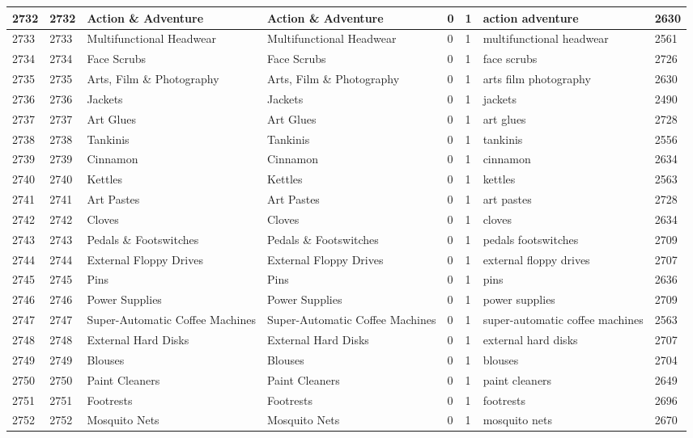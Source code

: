 \begin{longtable}{|l|l|l|l|l|l|l|l|}
2732 & 2732 & Action \& Adventure & Action \& Adventure & 0 & 1 & action adventure & 2630 \\ \hline 
2733 & 2733 & Multifunctional Headwear & Multifunctional Headwear & 0 & 1 & multifunctional headwear & 2561 \\ \hline 
2734 & 2734 & Face Scrubs & Face Scrubs & 0 & 1 & face scrubs & 2726 \\ \hline 
2735 & 2735 & Arts, Film \& Photography & Arts, Film \& Photography & 0 & 1 & arts film photography & 2630 \\ \hline 
2736 & 2736 & Jackets & Jackets & 0 & 1 & jackets & 2490 \\ \hline 
2737 & 2737 & Art Glues & Art Glues & 0 & 1 & art glues & 2728 \\ \hline 
2738 & 2738 & Tankinis & Tankinis & 0 & 1 & tankinis & 2556 \\ \hline 
2739 & 2739 & Cinnamon & Cinnamon & 0 & 1 & cinnamon & 2634 \\ \hline 
2740 & 2740 & Kettles & Kettles & 0 & 1 & kettles & 2563 \\ \hline 
2741 & 2741 & Art Pastes & Art Pastes & 0 & 1 & art pastes & 2728 \\ \hline 
2742 & 2742 & Cloves & Cloves & 0 & 1 & cloves & 2634 \\ \hline 
2743 & 2743 & Pedals \& Footswitches & Pedals \& Footswitches & 0 & 1 & pedals footswitches & 2709 \\ \hline 
2744 & 2744 & External Floppy Drives & External Floppy Drives & 0 & 1 & external floppy drives & 2707 \\ \hline 
2745 & 2745 & Pins & Pins & 0 & 1 & pins & 2636 \\ \hline 
2746 & 2746 & Power Supplies & Power Supplies & 0 & 1 & power supplies & 2709 \\ \hline 
2747 & 2747 & Super-Automatic Coffee Machines & Super-Automatic Coffee Machines & 0 & 1 & super-automatic coffee machines & 2563 \\ \hline 
2748 & 2748 & External Hard Disks & External Hard Disks & 0 & 1 & external hard disks & 2707 \\ \hline 
2749 & 2749 & Blouses & Blouses & 0 & 1 & blouses & 2704 \\ \hline 
2750 & 2750 & Paint Cleaners & Paint Cleaners & 0 & 1 & paint cleaners & 2649 \\ \hline 
2751 & 2751 & Footrests & Footrests & 0 & 1 & footrests & 2696 \\ \hline 
2752 & 2752 & Mosquito Nets & Mosquito Nets & 0 & 1 & mosquito nets & 2670 \\ \hline 

\end{longtable}
